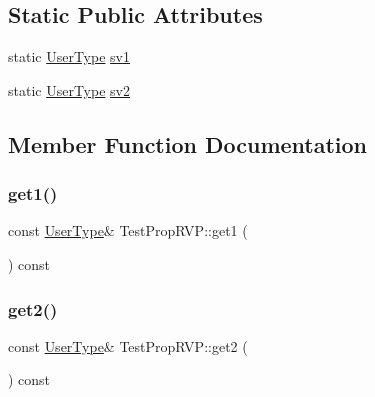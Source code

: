\subsection*{Static Public Attributes}
\begin{DoxyCompactItemize}
\item 
static \mbox{\hyperlink{class_user_type}{User\+Type}} \mbox{\hyperlink{struct_test_prop_r_v_p_a716e71ef0663c4f55cb6a6664e876eaf}{sv1}}
\item 
static \mbox{\hyperlink{class_user_type}{User\+Type}} \mbox{\hyperlink{struct_test_prop_r_v_p_a945b6ef24e72a96f63e0595e5c7196da}{sv2}}
\end{DoxyCompactItemize}


\subsection{Member Function Documentation}
\mbox{\label{struct_test_prop_r_v_p_ada1003e85c3d81e8824b2b8365c8a9de}} 
\subsubsection{\texorpdfstring{get1()}{get1()}}
{\footnotesize\ttfamily const \mbox{\hyperlink{class_user_type}{User\+Type}}\& Test\+Prop\+R\+V\+P\+::get1 (\begin{DoxyParamCaption}{ }\end{DoxyParamCaption}) const\hspace{0.3cm}{\ttfamily [inline]}}

\mbox{\label{struct_test_prop_r_v_p_acd49a7018a64359d86181da3b4e2d86c}} 
\subsubsection{\texorpdfstring{get2()}{get2()}}
{\footnotesize\ttfamily const \mbox{\hyperlink{class_user_type}{User\+Type}}\& Test\+Prop\+R\+V\+P\+::get2 (\begin{DoxyParamCaption}{ }\end{DoxyParamCaption}) const\hspace{0.3cm}{\ttfamily [inline]}}

\mbox{\label{struct_test_prop_r_v_p_a1c9ac5e3c204f3f4efed05b2d64d4744}} 
